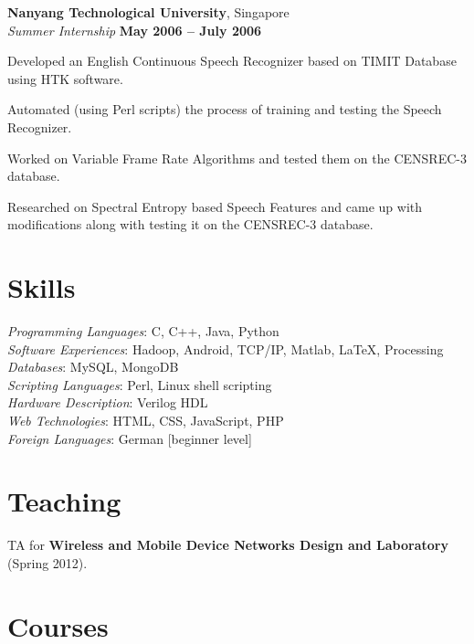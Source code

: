 \documentclass[margin,line]{resume}
\begin{document}
\begin{resume}
    \textbf{Nanyang Technological University}, Singapore \\%
    \textsl{Summer Internship} \hfill \textbf{May 2006 -- July 2006}
    \begin{list2}
    \item Developed an English Continuous Speech Recognizer based on TIMIT Database using HTK software.
    \item Automated (using Perl scripts) the process of training and testing the Speech Recognizer.
    \item Worked on Variable Frame Rate Algorithms and tested them on the CENSREC-3 database.
    \item Researched on Spectral Entropy based Speech Features and came up with modifications along with testing it on the CENSREC-3 database.
    \end{list2}
    

 \section{\mysidestyle Skills} 

    \textsl{Programming Languages}: C, C++, Java, Python\\
    \textsl{Software Experiences}: Hadoop, Android, TCP/IP, Matlab, \LaTeX, Processing\\
    \textsl{Databases}: MySQL, MongoDB\\
    \textsl{Scripting Languages}: Perl, Linux shell scripting \\
    \textsl{Hardware Description}: Verilog HDL \\
    \textsl{Web Technologies}: HTML, CSS, JavaScript, PHP \\
    \textsl{Foreign Languages}: German [beginner level]

\newpage

\section{\mysidestyle Teaching}
TA for \textbf{Wireless and Mobile Device Networks Design and Laboratory} (Spring 2012).

\section{\mysidestyle Courses} 


\end{resume}
\end{document}
